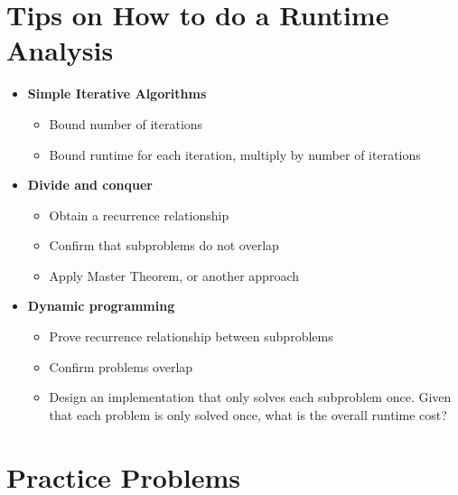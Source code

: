 \documentclass[11  pt]{exam}
\begin{document}
	
	\section{Tips on How to do a Runtime Analysis}
	
	\begin{itemize}
		\item \textbf{Simple Iterative Algorithms}
		\begin{itemize} 
			\item Bound number of iterations
			\item Bound runtime for each iteration, multiply by number of iterations
		\end{itemize}
		\item \textbf{Divide and conquer}
		\begin{itemize} 
			\item Obtain a recurrence relationship
			\item Confirm that subproblems do not overlap
			\item Apply Master Theorem, or another approach
		\end{itemize}
		\item \textbf{Dynamic programming}
		\begin{itemize} 
			\item Prove recurrence relationship between subproblems
			\item Confirm problems overlap
			\item Design an implementation that only solves each subproblem once. Given that each problem is only solved once, what is the overall runtime cost?
		\end{itemize}
	\end{itemize}
	\newpage
	
	\section{Practice Problems}
	
\end{document}
